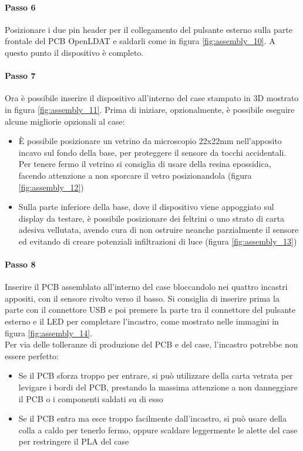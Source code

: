\paragraph{Passo 6} Posizionare i due pin header per il collegamento del pulsante esterno sulla parte frontale del PCB OpenLDAT e saldarli come in figura \ref{fig:assembly_10}. A questo punto il dispositivo è completo.

\paragraph{Passo 7} Ora è possibile inserire il dispositivo all'interno del case stampato in 3D mostrato in figura \ref{fig:assembly_11}. Prima di iniziare, opzionalmente, è possibile eseguire alcune migliorie opzionali al case:
\begin{itemize}
	\item È possibile posizionare un vetrino da microscopio 22x22mm nell'apposito incavo sul fondo della base, per proteggere il sensore da tocchi accidentali. Per tenere fermo il vetrino si consiglia di usare della resina epossidica, facendo attenzione a non sporcare il vetro posizionandola (figura \ref{fig:assembly_12})
	\item Sulla parte inferiore della base, dove il dispositivo viene appoggiato sul display da testare, è possibile posizionare dei feltrini o uno strato di carta adesiva vellutata, avendo cura di non ostruire neanche parzialmente il sensore ed evitando di creare potenziali infiltrazioni di luce (figura \ref{fig:assembly_13})
\end{itemize}

\paragraph{Passo 8} Inserire il PCB assemblato all'interno del case bloccandolo nei quattro incastri appositi, con il sensore rivolto verso il basso. Si consiglia di inserire prima la parte con il connettore USB e poi premere la parte tra il connettore del pulsante esterno e il LED per completare l'incastro, come mostrato nelle immagini in figura \ref{fig:assembly_14}.\\
Per via delle tolleranze di produzione del PCB e del case, l'incastro potrebbe non essere perfetto:\begin{itemize}
	\item Se il PCB sforza troppo per entrare, si può utilizzare della carta vetrata per levigare i bordi del PCB, prestando la massima attenzione a non danneggiare il PCB o i componenti saldati su di esso
	\item Se il PCB entra ma esce troppo facilmente dall'incastro, si può usare della colla a caldo per tenerlo fermo, oppure scaldare leggermente le alette del case per restringere il PLA del case
\end{itemize}

